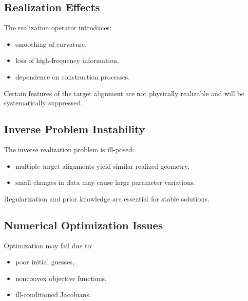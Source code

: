 \subsection{Realization Effects}

The realization operator introduces:
\begin{itemize}
\item smoothing of curvature,
\item loss of high-frequency information,
\item dependence on construction processes.
\end{itemize}

\begin{proposition}
Certain features of the target alignment are not physically realizable
and will be systematically suppressed.
\end{proposition}


\subsection{Inverse Problem Instability}

The inverse realization problem is ill-posed:
\begin{itemize}
\item multiple target alignments yield similar realized geometry,
\item small changes in data may cause large parameter variations.
\end{itemize}

\begin{proposition}
Regularization and prior knowledge are essential for stable solutions.
\end{proposition}


\subsection{Numerical Optimization Issues}

Optimization may fail due to:
\begin{itemize}
\item poor initial guesses,
\item nonconvex objective functions,
\item ill-conditioned Jacobians.
\end{itemize}

